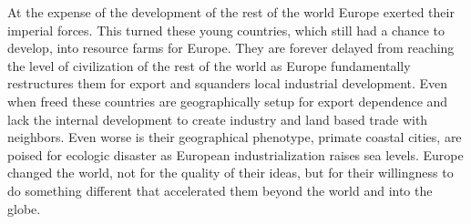 \documentclass[a4paper, 12pt]{article}
\begin{document}
At the expense of the development of the rest of the world Europe exerted their imperial forces. This turned these young countries, which still had a chance to develop, into resource farms for Europe. They are forever delayed from reaching the level of civilization of the rest of the world as Europe fundamentally restructures them for export and squanders local industrial development. Even when freed these countries are geographically setup for export dependence and lack the internal development to create industry and land based trade with neighbors. Even worse is their geographical phenotype, primate coastal cities, are poised for ecologic disaster as European industrialization raises sea levels. Europe changed the world, not for the quality of their ideas, but for their willingness to do something different that accelerated them beyond the world and into the globe.
\end{document}

